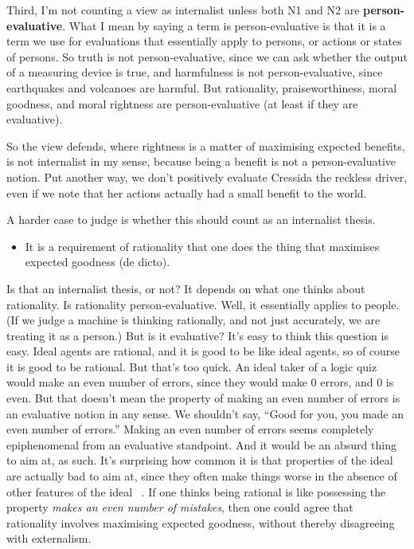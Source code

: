 Third, I'm not counting a view as internalist unless both N1 and N2 are \textbf{person-evaluative}. What I mean by saying a term is person-evaluative is that it is a term we use for evaluations that essentially apply to persons, or actions or states of persons. So truth is not person-evaluative, since we can ask whether the output of a measuring device is true, and harmfulness is not person-evaluative, since earthquakes and volcanoes are harmful. But rationality, praiseworthiness, moral goodness, and moral rightness are person-evaluative (at least if they are evaluative).

So the view \citet{Jackson1991} defends, where rightness is a matter of maximising expected benefits, is not internalist in my sense, because being a benefit is not a person-evaluative notion. Put another way, we don't positively evaluate \gls{Cressida} the reckless driver, even if we note that her actions actually had a small benefit to the world.

A harder case to judge is whether this should count as an internalist thesis.

\begin{itemize}
\item{} It is a requirement of rationality that one does the thing that maximises expected goodness (de dicto).

\end{itemize}
Is that an internalist thesis, or not? It depends on what one thinks about rationality. Is rationality person-evaluative. Well, it essentially applies to people. (If we judge a machine is thinking rationally, and not just accurately, we are treating it as a person.) But is it evaluative? It's easy to think this question is easy. Ideal agents are rational, and it is good to be like ideal agents, so of course it is good to be rational. But that's too quick. An ideal taker of a logic quiz would make an even number of errors, since they would make 0 errors, and 0 is even. But that doesn't mean the property of making an even number of errors is an evaluative notion in any sense. We shouldn't say, ``Good for you, you made an even number of errors.'' Making an even number of errors seems completely epiphenomenal from an evaluative standpoint. And it would be an absurd thing to aim at, as such. It's surprising how common it is that properties of the ideal are actually bad to aim at, since they often make things worse in the absence of other features of the ideal ~\citep{LipseyLancaster}. If one thinks being rational is like possessing the property \emph{makes an even number of mistakes}, then one could agree that rationality involves maximising expected goodness, without thereby disagreeing with externalism.


